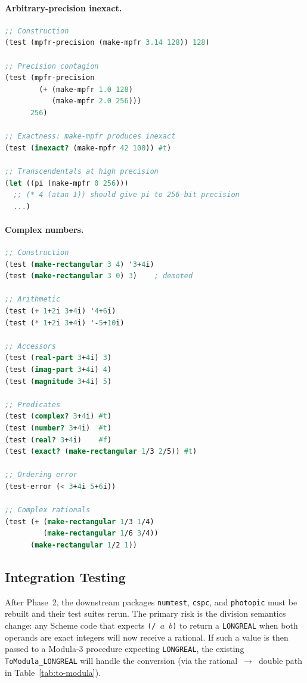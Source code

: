 \documentclass[12pt]{article}
\begin{document}
\paragraph{Arbitrary-precision inexact.}
\begin{lstlisting}[language=Scheme]
;; Construction
(test (mpfr-precision (make-mpfr 3.14 128)) 128)

;; Precision contagion
(test (mpfr-precision
        (+ (make-mpfr 1.0 128)
           (make-mpfr 2.0 256)))
      256)

;; Exactness: make-mpfr produces inexact
(test (inexact? (make-mpfr 42 100)) #t)

;; Transcendentals at high precision
(let ((pi (make-mpfr 0 256)))
  ;; (* 4 (atan 1)) should give pi to 256-bit precision
  ...)
\end{lstlisting}

\paragraph{Complex numbers.}
\begin{lstlisting}[language=Scheme]
;; Construction
(test (make-rectangular 3 4) '3+4i)
(test (make-rectangular 3 0) 3)    ; demoted

;; Arithmetic
(test (+ 1+2i 3+4i) '4+6i)
(test (* 1+2i 3+4i) '-5+10i)

;; Accessors
(test (real-part 3+4i) 3)
(test (imag-part 3+4i) 4)
(test (magnitude 3+4i) 5)

;; Predicates
(test (complex? 3+4i) #t)
(test (number? 3+4i)  #t)
(test (real? 3+4i)    #f)
(test (exact? (make-rectangular 1/3 2/5)) #t)

;; Ordering error
(test-error (< 3+4i 5+6i))

;; Complex rationals
(test (+ (make-rectangular 1/3 1/4)
         (make-rectangular 1/6 3/4))
      (make-rectangular 1/2 1))
\end{lstlisting}

\subsection{Integration Testing}

After Phase~2, the downstream packages {\tt numtest}, {\tt cspc},
and {\tt photopic} must be rebuilt and their test suites rerun.  The
primary risk is the division semantics change: any Scheme code that
expects {\tt (/ $a$ $b$)} to return a {\tt LONGREAL} when both
operands are exact integers will now receive a rational.  If such a
value is then passed to a Modula-3 procedure expecting {\tt LONGREAL},
the existing {\tt ToModula\_LONGREAL} will handle the conversion
(via the rational~$\to$~double path in Table~\ref{tab:to-modula}).
\end{document}
